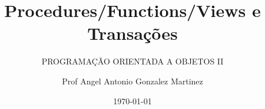 

\usepackage[brazil]{babel}		%
\usepackage{color}				%
\usepackage[T1]{fontenc}		%
\usepackage{graphicx}			%
\usepackage[utf8]{inputenc}		%
\usepackage{txfonts}




\title[POO II]{Procedures/Functions/Views e Transações}
\subtitle{PROGRAMAÇÃO ORIENTADA A OBJETOS II}
\author{Prof Angel Antonio Gonzalez Martinez}
\date{\today}


\makeatletter
{}
\renewcommand\footnoterule{{\color{ilpayellow}\hrule height 0.5pt width \paperwidth}}




\newdimen\Metade%
\setlength{\Metade}{.5\paperwidth}%
\addtolength{\Metade}{-\beamer@sidebarwidth}%



	
